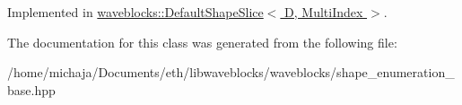 Implemented in \hyperlink{classwaveblocks_1_1_default_shape_slice_ad43e2ba8c9f6de8215afe3058f379c29}{waveblocks\+::\+Default\+Shape\+Slice$<$ D, Multi\+Index $>$}.



The documentation for this class was generated from the following file\+:\begin{DoxyCompactItemize}
\item 
/home/michaja/\+Documents/eth/libwaveblocks/waveblocks/shape\+\_\+enumeration\+\_\+base.\+hpp\end{DoxyCompactItemize}
